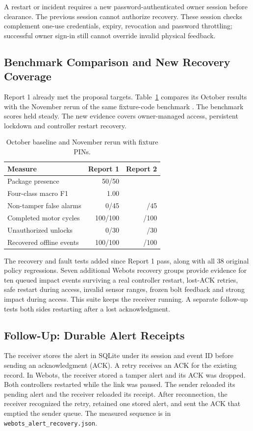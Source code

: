 \documentclass[conference,letterpaper]{IEEEtran}
\newcommand{\code}[1]{\texttt{\small #1}}
\begin{document}
A restart or incident requires a new password-authenticated owner session before clearance. The previous session cannot authorize recovery. These session checks complement one-use credentials, expiry, revocation and password throttling; successful owner sign-in still cannot override invalid physical feedback.

\subsection{Benchmark Comparison and New Recovery Coverage}
Report 1 already met the proposal targets. Table~\ref{tab:baseline} compares its October results with the November rerun of the same fixture-code benchmark \cite{progressone,evidence}. The benchmark scores held steady. The new evidence covers owner-managed access, persistent lockdown and controller restart recovery.
\begin{table}[t]\centering\small
\caption{October baseline and November rerun with fixture PINs.}\label{tab:baseline}
\begin{tabular}{@{}lrr@{}}\toprule
Measure & Report 1 & Report 2\\\midrule
Package presence & 50/50 & \Presence{}\\
Four-class macro F1 & 1.00 & \MacroF{}\\
Non-tamper false alarms & 0/45 & \FalseAlarms{}/45\\
Completed motor cycles & 100/100 & \Cycles{}/100\\
Unauthorized unlocks & 0/30 & \Unauthorized{}/30\\
Recovered offline events & 100/100 & \Recovered{}/100\\\bottomrule
\end{tabular}\end{table}

The \RecoveryTests{} recovery and fault tests added since Report 1 pass, along with all 38 original policy regressions. Seven additional Webots recovery groups provide evidence for ten queued impact events surviving a real controller restart, lost-ACK retries, safe restart during access, invalid sensor ranges, frozen bolt feedback and strong impact during access. This suite keeps the receiver running. A separate follow-up tests both sides restarting after a lost acknowledgment.

\subsection{Follow-Up: Durable Alert Receipts}
The receiver stores the alert in SQLite under its session and event ID before sending an acknowledgment (ACK). A retry receives an ACK for the existing record. In Webots, the receiver stored a tamper alert and its ACK was dropped. Both controllers restarted while the link was paused. The sender reloaded its pending alert and the receiver reloaded its receipt. After reconnection, the receiver recognized the retry, retained one stored alert, and sent the ACK that emptied the sender queue. The measured sequence is in \code{webots\_alert\_recovery.json}.
\end{document}
